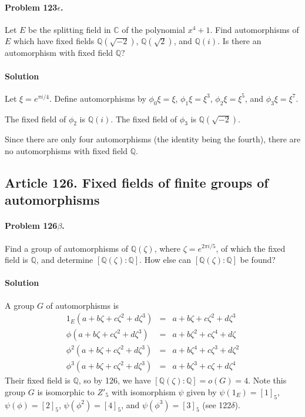 \paragraph{Problem 123$\epsilon$.}
Let $E$ be the splitting field in $\mathbb{C}$ of the polynomial $x^4 + 1$.
Find automorphisms of $E$ which have fixed fields $\mathbb{Q}(\sqrt{-2})$,
$\mathbb{Q}(\sqrt{2})$, and $\mathbb{Q}(i)$. Is there an automorphism
with fixed field $\mathbb{Q}$?

\paragraph*{Solution}
Let $\xi = e^{\pi i / 4}$. Define automorphisms by
$\phi_0 \xi = \xi$,
$\phi_1 \xi = \xi^3$, $\phi_2 \xi = \xi^5$, and
$\phi_3 \xi = \xi^7$.

The fixed field of $\phi_2$ is $\mathbb{Q}(i)$. The fixed field of $\phi_3$
is $\mathbb{Q}(\sqrt{-2})$.

Since there are only four automorphisms (the identity being the fourth),
there are no automorphisms with fixed field $\mathbb{Q}$.

\subsection{Article 126. Fixed fields of finite groups of
  automorphisms}

\paragraph{Problem 126$\beta$.}
Find a group of automorphisms of $\mathbb{Q}(\zeta)$, where $\zeta = e^{2\pi i /5}$,
of which the fixed field is $\mathbb{Q}$, and determine
$\left[\mathbb{Q}(\zeta):\mathbb{Q}\right]$. How else can
$\left[\mathbb{Q}(\zeta):\mathbb{Q}\right]$ be found?

\paragraph*{Solution}
A group $G$ of automorphisms is
\begin{eqnarray}
1_E(a+b\zeta+c\zeta^2+d\zeta^3) &=& a+b\zeta+c\zeta^2+d\zeta^3 \nonumber \\
\phi(a+b\zeta+c\zeta^2+d\zeta^3) &=& a+b\zeta^2+c\zeta^4+d\zeta \nonumber \\
\phi^2(a+b\zeta+c\zeta^2+d\zeta^3) &=& a+b\zeta^4+c\zeta^3+d\zeta^2 \nonumber \\
\phi^3(a+b\zeta+c\zeta^2+d\zeta^3) &=& a+b\zeta^3+c\zeta+d\zeta^4 \nonumber
\end{eqnarray}
Their fixed field is $\mathbb{Q}$, so by 126, we have
$\left[\mathbb{Q}(\zeta):\mathbb{Q}\right] = o(G) = 4$. Note this group $G$ is
isomorphic to $Z'_5$ with isomorphism $\psi$ given by $\psi(1_E) = [1]_5$,
$\psi(\phi) = [2]_5$, $\psi(\phi^2) = [4]_5$, and $\psi(\phi^3) = [3]_5$
(see 122$\delta$).


